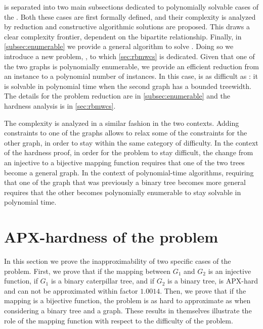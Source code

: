 	 is separated into two main subsections dedicated to polynomially solvable cases of the \mwccs{}.
	Both these cases are first formally defined, and their complexity is analyzed by reduction and constructive algorithmic solutions are proposed.
	This draws a clear complexity frontier, dependent on the bipartite relationship.
	Finally, in \cref{subsec:enumerable} we provide a general algorithm to solve \mwccs{}.
	Doing so we introduce a new problem, \rbmwcs{}, to which \cref{sec:rbmwcs} is dedicated.
	Given that one of the two graphs is polynomially enumerable, we provide an efficient reduction from an \mwccs{} instance to a polynomial number of \rbmwcs{} instances.
	In this case, \mwccs{} is as difficult as \rbmwcs{}: it is solvable in polynomial time when the second graph has a bounded treewidth.
	The details for the problem reduction are in \cref{subsec:enumerable} and the \rbmwcs{} hardness analysis is in \cref{sec:rbmwcs}.

	The complexity is analyzed in a similar fashion in the two contexts.
	Adding constraints to one of the graphs allows to relax some of the constraints for the other graph, in order to stay within the same category of difficulty.
	In the context of the hardness proof, in order for the problem to stay difficult, the change from an injective to a bijective mapping function requires that one of the two trees become a general graph.
	In the context of polynomial-time algorithms, requiring that one of the graph that was previously a binary tree becomes more general %
	requires that the other becomes polynomially enumerable to stay solvable in polynomial time.
	
	\section{APX-hardness of the \mwccs{} problem}
	\label{sec:apx}

		In this section we prove the inapproximability of two specific cases of the \mwccs{} problem.
		First, we prove that if the mapping between $G_1$ and $G_2$ is an injective function, if $G_1$ is a binary caterpillar tree, and if $G_2$ is a binary tree, \mwccs{} is APX-hard and can not be approximated within factor $1.0014$.
		Then, we prove that if the mapping is a bijective function, the problem is as hard to approximate as when considering a binary tree and a graph.
		These results in themselves illustrate the role of the mapping function with respect to the difficulty of the problem.

